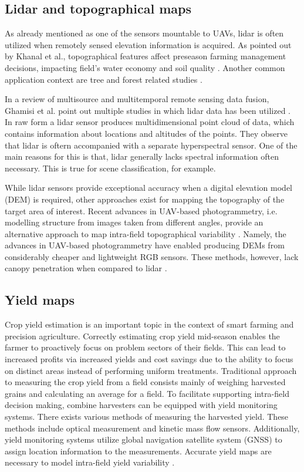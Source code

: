 \subsection{Lidar and topographical maps}
\label{subsec:data-topo-review}

As already mentioned as one of the sensors mountable to UAVs, lidar is often utilized when remotely sensed elevation information is acquired. As pointed out by Khanal et al., topographical features affect preseason farming management decisions, impacting field's water economy and soil quality \cite{Khanal2020}. Another common application context are tree and forest related studies \cite{Salmivaara2020}.

In a review of multisource and multitemporal remote sensing data fusion, Ghamisi et al. point out multiple studies in which lidar data has been utilized \cite{Ghamisi2019}. In raw form a lidar sensor produces multidimensional point cloud of data, which contains information about locations and altitudes of the points. They observe that lidar is oftern accompanied with a separate hyperspectral sensor. One of the main reasons for this is that, lidar generally lacks spectral information often necessary. This is true for scene classification, for example.

While lidar sensors provide exceptional accuracy when a digital elevation model (DEM) is required, other approaches exist for mapping the topography of the target area of interest. Recent advances in UAV-based photogrammetry, i.e. modelling structure from images taken from different angles, provide an alternative approach to map intra-field topographical variability \cite{Khanal2020}. Namely, the advances in UAV-based photogrammetry have enabled producing DEMs from considerably cheaper and lightweight RGB sensors. These methods, however, lack canopy penetration when compared to lidar \cite{Maimaitijiang2020}.


\subsection{Yield maps}
\label{subsec:data-yield-review}

Crop yield estimation is an important topic in the context of smart farming and precision agriculture. Correctly estimating crop yield mid-season enables the farmer to proactively focus on problem sectors of their fields. This can lead to increased profits via increased yields and cost savings due to the ability to focus on distinct areas instead of performing uniform treatments. Traditional approach to measuring the crop yield from a field consists mainly of weighing harvested grains and calculating an average for a field. To facilitate supporting intra-field decision making, combine harvesters can be equipped with yield monitoring systems. There exists various methods of measuring the harvested yield. These methods include optical measurement and kinetic mass flow sensors. Additionally, yield monitoring systems utilize global navigation satellite system (GNSS) to assign location information to the measurements. Accurate yield maps are necessary to model intra-field yield variability \cite{Khanal2020}.

